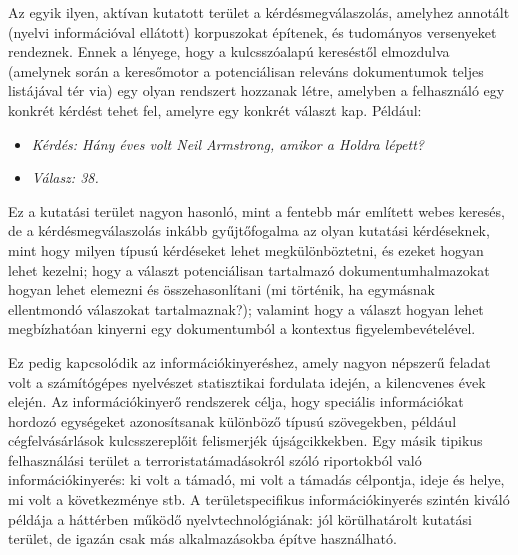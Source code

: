 \begin{multicols}{2}

  Az egyik ilyen, aktívan kutatott terület a kérdésmegválaszolás, amelyhez annotált (nyelvi információval ellátott) korpuszokat építenek, és tudományos versenyeket rendeznek. Ennek a lényege, hogy a kulcsszóalapú kereséstől elmozdulva (amelynek során a keresőmotor a potenciálisan releváns dokumentumok teljes listájával tér via) egy olyan rendszert hozzanak létre, amelyben a felhasználó egy konkrét kérdést tehet fel, amelyre egy konkrét választ kap. Például:
  
  \begin{itemize}
    \item[] \textit{Kérdés: Hány éves volt Neil Armstrong, amikor a Holdra lépett?}
    \item[] \textit{Válasz: 38.}
  \end{itemize}

  Ez a kutatási terület nagyon hasonló, mint a fentebb már említett webes keresés, de a kérdésmegválaszolás inkább gyűjtőfogalma az olyan kutatási kérdéseknek, mint hogy milyen típusú kérdéseket lehet megkülönböztetni, és ezeket hogyan lehet kezelni; hogy a választ potenciálisan tartalmazó dokumentumhalmazokat hogyan lehet elemezni és összehasonlítani (mi történik, ha egymásnak ellentmondó vá\-la\-szo\-kat tartalmaznak?); valamint hogy a választ hogyan lehet megbízhatóan ki\-nyer\-ni egy dokumentumból a kontextus figyelembevételével. 

  Ez pedig kapcsolódik az in\-for\-má\-ció\-ki\-nye\-rés\-hez, amely nagyon népszerű feladat volt a számítógépes nyelvészet statisztikai fordulata idején, a kilencvenes évek elején. Az információkinyerő rendszerek célja, hogy speciális információkat hordozó egységeket azonosítsanak különböző típusú szövegekben, például cégfelvásárlások kulcsszereplőit felismerjék újságcikkekben. Egy másik tipikus felhasználási terület a terroristatámadásokról szóló riportokból való információkinyerés: ki volt a támadó, mi volt a támadás célpontja, ideje és helye, mi volt a következménye stb. A területspecifikus in\-for\-má\-ció\-ki\-nye\-rés szintén kiváló példája a háttérben működő nyelvtechnológiának: jól körülhatárolt kutatási terület, de igazán csak más alkalmazásokba építve használható.  


\end{multicols}
